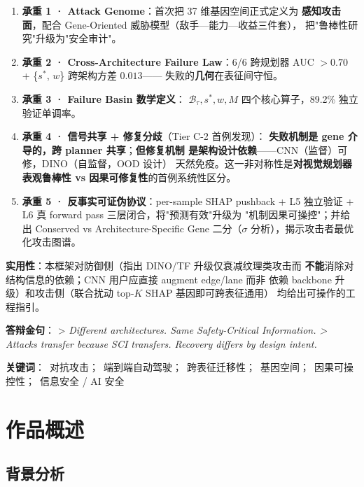 \documentclass[a4paper,12pt,fontset=fandol]{ctexart}
\begin{document}
\begin{enumerate}[leftmargin=*]
\item \textbf{承重 1 · Attack Genome}：首次把 37 维基因空间正式定义为
      \textbf{感知攻击面}，配合 Gene-Oriented 威胁模型（敌手—能力—收益三件套），
      把"鲁棒性研究"升级为"安全审计"。
\item \textbf{承重 2 · Cross-Architecture Failure Law}：6/6 跨规划器 AUC
      $> 0.70$ + \{$s^*$, $w$\} 跨架构方差 $0.013$——
      失败的\textbf{几何}在表征间守恒。
\item \textbf{承重 3 · Failure Basin 数学定义}：
      $\mathcal{B}_{\tau}, s^*, w, M$ 四个核心算子，89.2\% 独立验证单调率。
\item \textbf{承重 4 · 信号共享 + 修复分歧}（Tier C-2 首例发现）：
      \textbf{失败机制是 gene 介导的，跨 planner 共享}；\textbf{但修复机制
      是架构设计依赖}——CNN（监督）可修，DINO（自监督，OOD 设计）
      天然免疫。这一非对称性是\textbf{对视觉规划器表观鲁棒性
      vs 因果可修复性}的首例系统性区分。
\item \textbf{承重 5 · 反事实可证伪协议}：per-sample SHAP pushback +
      L5 独立验证 + L6 真 forward pass 三层闭合，将"预测有效"升级为
      "机制因果可操控"；并给出 Conserved vs Architecture-Specific Gene
      二分（$\sigma$ 分析），揭示攻击者最优化攻击图谱。
\end{enumerate}

\textbf{实用性}：本框架对防御侧（指出 DINO/TF 升级仅衰减纹理类攻击而
\textbf{不能}消除对结构信息的依赖；CNN 用户应直接 augment edge/lane 而非
依赖 backbone 升级）和攻击侧（联合扰动 top-$K$ SHAP 基因即可跨表征通用）
均给出可操作的工程指引。

\textbf{答辩金句}：
> \textit{Different architectures. Same Safety-Critical Information.
> Attacks transfer because SCI transfers. Recovery differs by design intent.}

\vspace{6pt}
\noindent\textbf{关键词}：\ 对抗攻击；\ 端到端自动驾驶；\ 跨表征迁移性；\
基因空间；\ 因果可操控性；\ 信息安全 / AI 安全

\newpage

\section{作品概述}

\subsection{背景分析}
\end{document}

